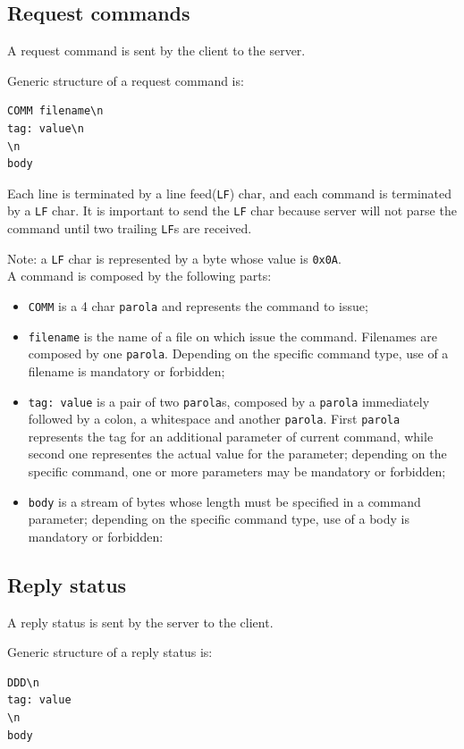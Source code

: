 \documentclass[a4paper,12pt]{article}
\begin{document}
\subsection{Request commands}
A request command is sent by the client to the server.

Generic structure of a request command is:
\begin{verbatim}
COMM filename\n
tag: value\n
\n
body
\end{verbatim}

Each line is terminated by a line feed(\texttt{LF}) char, and each command is terminated by a \texttt{LF} char.
It is important to send the \texttt{LF} char because server will not parse the command until two trailing \texttt{LF}s are received.

Note: a \texttt{LF} char is represented by a byte whose value is \texttt{0x0A}.
\\
A command is composed by the following parts:
\begin{itemize}
  \item \texttt{COMM} is a 4 char \texttt{parola} and represents the command to issue;
  \item \texttt{filename} is the name of a file on which issue the command.
  Filenames are composed by one \texttt{parola}.
  Depending on the specific command type, use of a filename is mandatory or forbidden;
  \item \texttt{tag: value} is a pair of two \texttt{parola}s, composed by a \texttt{parola} immediately followed by a colon, a whitespace and another \texttt{parola}.
  First \texttt{parola} represents the tag for an additional parameter of current command, while second one representes the actual value for the parameter; depending on the specific command, one or more parameters may be mandatory or forbidden;
  \item \texttt{body} is a stream of bytes whose length must be specified in a command parameter; depending on the specific command type, use of a body is mandatory or forbidden:
\end{itemize}

\subsection{Reply status}
A reply status is sent by the server to the client.

Generic structure of a reply status is:

\begin{verbatim}
DDD\n
tag: value
\n
body
\end{verbatim}
\end{document}
